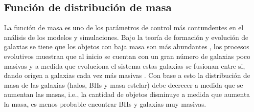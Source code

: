     \subsection{ Función de distribución de masa}
    \label{subsec: funcion de masa}
La función de masa es uno de los parámetros de control más contundentes en el análisis de los modelos y simulaciones. Bajo la teoría de formación y evolución de galaxias se tiene que los objetos con baja masa son más abundantes \cite{li2009}, los procesos evolutivos muestran que al inicio se cuentan con un gran número de galaxias poco masivas y a medida que evoluciona el sistema estas galaxias se fusionan entre si, dando origen a galaxias cada vez más masivas \cite{schneider2006}. 
Con base a esto la distribución de masa de las galaxias (halos, BHs y masa estelar) debe decrecer a medida que se aumentan las masas, i.e., la cantidad de objetos disminuye a medida que aumenta la masa, es menos probable encontrar BHs y galaxias muy masivas.
%
